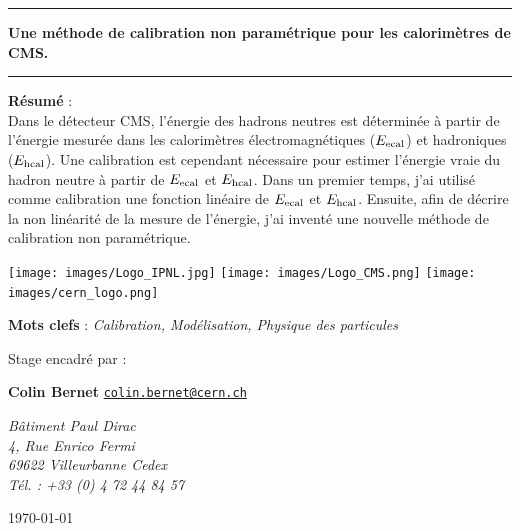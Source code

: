 \documentclass[11pt,a4paper]{article}
\begin{document}
\begin{center}

\vspace{1cm}

\rule[11pt]{5cm}{0.5pt}

\textbf{\huge Une méthode de calibration non paramétrique pour les calorimètres de CMS.}

\rule{5cm}{0.5pt}

\vspace{2cm}

\parbox{15cm}{\small
\textbf{Résumé} : \\
\rm Dans le détecteur CMS, l'énergie des hadrons neutres est déterminée à partir de l'énergie mesurée dans les calorimètres électromagnétiques ($E_{\rm ecal}$) et hadroniques ($E_{\rm hcal}$). Une calibration est cependant nécessaire pour estimer l'énergie vraie du hadron neutre à partir de $E_{\rm ecal}$ et $E_{\rm hcal}$. Dans un premier temps, j'ai utilisé comme calibration une fonction linéaire de $E_{\rm ecal}$ et $E_{\rm hcal}$. Ensuite, afin de décrire la non linéarité de la mesure de l'énergie, j'ai inventé une nouvelle méthode de calibration non paramétrique.
}

\vspace{1cm}
\begin{center}
\texttt{[image: images/Logo\_IPNL.jpg]} 
\hspace{1cm}
\texttt{[image: images/Logo\_CMS.png]} 
\hspace{1cm}
\texttt{[image: images/cern\_logo.png]} 
\end{center}
\vspace{1cm}

\parbox{15cm}{
\textbf{Mots clefs} : \it Calibration, Modélisation, Physique des particules
} 

\vspace{0.5cm}

\parbox{15cm}{
Stage encadré par :

{\bf Colin Bernet}
\href{mailto:colin.bernet@cern.ch}{\tt colin.bernet@cern.ch} 


{\it Bâtiment Paul Dirac\\
4, Rue Enrico Fermi\\
69622 Villeurbanne Cedex\\
Tél. : +33 (0) 4 72 44 84 57}

} %

\vspace{0.5cm}

\end{center}
\vfill
\hfill \today
\end{document}
